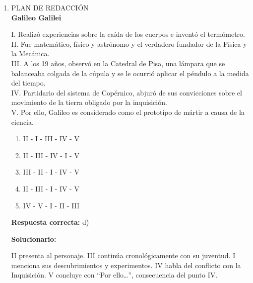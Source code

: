 \begin{enumerate}[resume]
	\textbf{Respuesta correcta:} e)
	
	\vspace{2mm}
	\textbf{Solucionario:}
	
	La relación es de proceso a producto: la sedimentación genera el estrato (una capa de sedimentos). De manera análoga, una base constituye el fundamento o soporte de una capa en diversas estructuras o formaciones.
	
	\vspace{6mm}
	
	\item PLAN DE REDACCIÓN \\
	\textbf{Galileo Galilei}
	
	I. Realizó experiencias sobre la caída de los cuerpos e inventó el termómetro. \\
	II. Fue matemático, físico y astrónomo y el verdadero fundador de la Física y la Mecánica. \\
	III. A los 19 años, observó en la Catedral de Pisa, una lámpara que se balanceaba colgada de la cúpula y se le ocurrió aplicar el péndulo a la medida del tiempo. \\
	IV. Partidario del sistema de Copérnico, abjuró de sus convicciones sobre el movimiento de la tierra obligado por la inquisición. \\
	V. Por ello, Galileo es considerado como el prototipo de mártir a causa de la ciencia.
	
	\begin{enumerate}[label=\alph*)]
		\item II - I - III - IV - V
		\item II - III - IV - I - V
		\item III - II - I - IV - V
		\item II - III - I - IV - V
		\item IV - V - I - II - III
	\end{enumerate}
	
	\textbf{Respuesta correcta:} d)
	
	\vspace{2mm}
	\textbf{Solucionario:}
	
	II presenta al personaje.
	III continúa cronológicamente con su juventud.
	I menciona sus descubrimientos y experimentos.
	IV habla del conflicto con la Inquisición.
	V concluye con “Por ello…”, consecuencia del punto IV.
	
	\vspace{6mm}
	

\end{enumerate}
